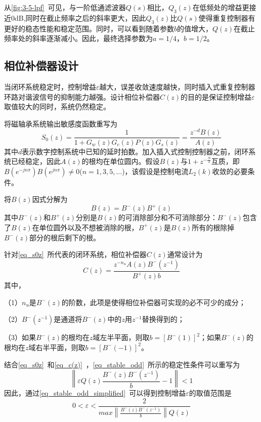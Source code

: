 \documentclass[
  lang=cn,
  degree=master,
  openany,oneside
]{nuaathesis}
\begin{document}
从\autoref{fig:3-5-lpf}~可见，与一阶低通滤波器$Q(s)$相比，$Q_3(z)$在低频处的增益更接近0dB,同时在截止频率之后的斜率更大，因此$Q_3(z)$比$Q(s)$使得重复控制器有更好的稳态性能和稳定范围。同时，可以看到随着参数$b$的值增大，$Q(z)$在截止频率处的斜率逐渐减小。因此，最终选择参数为$a=1/4$，$b=1/2$。
\subsection{相位补偿器设计}
当闭环系统稳定时，控制增益$\varepsilon$越大，误差收敛速度越快，同时插入式重复控制器环路对谐波信号的抑制能力越强。设计相位补偿器$C(z)$的目的是保证控制增益$\varepsilon$取值较大的同时，系统仍然稳定。

将磁轴承系统输出敏感度函数重写为
\begin{equation}
\label{eq_s0z}
S_0(z)=\frac{1}{1+G_w(z)G_c(z)P(z)G_s(z)}=\frac{z^{-d}B(z)}{A(z)}
\end{equation}
其中$d$表示数字控制系统中已知的延时拍数。加入插入式控制控制器之前，闭环系统已经稳定，因此$A(z)$的根均在单位圆内。假设$B(z)$与$1+z^{-\frac{N}{2}}$互质，即$B(e^{-jn\pi})B(e^{jn\pi})\neq 0$($n=1,3,5,...$)，该假设是控制电流$L_2(k)$收敛的必要条件。

将$B(z)$因式分解为
\begin{equation}
B(z)=B^-(z)B^+(z)
\end{equation}
其中$B^-(z)$和$B^+(z)$分别是$B(z)$的可消除部分和不可消除部分：$B^-(z)$包含了$B(z)$在单位圆外以及不想被消除的根，$B^+(z)$是$B(z)$所有的根除掉$B^-(z)$部分的根后剩下的根。

针对\autoref{eq_s0z}~所代表的闭环系统，相位补偿器$C(z)$通常设计为
\begin{equation}
\label{eq_c(z)}
C(z)=\frac{z^{-n_u}A(z)B^-(z^{-1})}{B^+(z)b}
\end{equation}
其中，

（1）$n_u$是$B^-(z)$的阶数，此项是使得相位补偿器可实现的必不可少的成分；

（2）$B^-(z^{-1})$是通道将$B^-(z)$中的$z$用$z^{-1}$替换得到的；

（3）如果$B^-(z)$的根均在$z$域左半平面，则取$b={\left[ B^-(1)\right]}^2$；如果$B^-(z)$的根均在$z$域右半平面，则取$b={\left[ B^-(-1)\right]}^2$。

结合\autoref{eq_s0z}~和\autoref{eq_c(z)}~，\autoref{eq_stable_odd}~所示的稳定性条件可以重写为
\begin{equation}
	\label{eq_stable_odd_simplified}
	\left\|\varepsilon Q(z)\frac{B^-(z)B^-(z^{-1})}{b}-1\right\|<1
\end{equation}
因此，通过\autoref{eq_stable_odd_simplified}~可以得到控制增益$\varepsilon$的取值范围是
\begin{equation}
	\label{eq_range_gain}
	0 < \varepsilon < \frac{2}{max\left \| \frac{B^-(z)B^-(z^{-1})}{b}\right \|Q(z)}
\end{equation}
\end{document}

